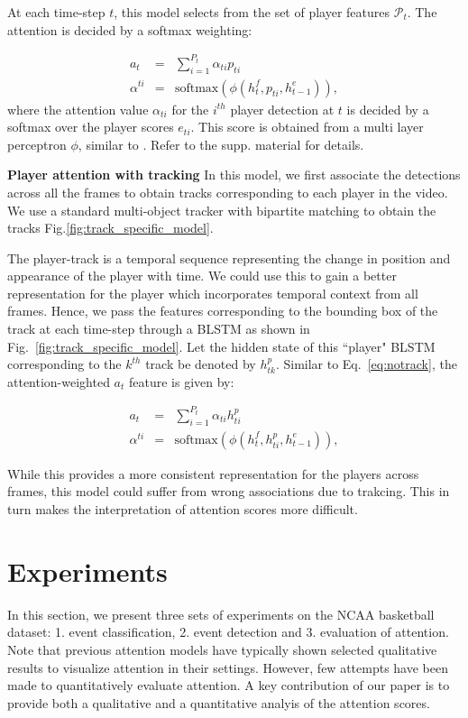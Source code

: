 \documentclass[10pt,twocolumn,letterpaper]{article}
\begin{document}
At each time-step $t$, this model selects from the set of player features
$\mathcal{P}_t$. The attention is decided by a softmax weighting:

\begin{eqnarray} \label{eq:notrack}
  a_t & = & \sum_{i=1}^{P_t} \alpha_{ti} p_{ti} \\ \nonumber
  \alpha^{ti} & = & \text{softmax} \left(\phi\left(h^f_t, p_{ti}, h^e_{t-1}\right)\right),
\end{eqnarray}where the attention value $\alpha_{ti}$ for the $i^{th}$ player
detection at $t$ is decided by a softmax over the player scores $e_{ti}$. This
score is obtained from a multi layer perceptron $\phi$, similar to
\cite{Bahdnau_arxiv14}. Refer to the supp. material for details.

\noindent \textbf{Player attention with tracking}
In this model, we first associate the detections across all the frames to
obtain tracks corresponding to each player in the video.  We use a
standard multi-object tracker with bipartite matching to obtain the tracks
Fig.\ref{fig:track_specific_model}.

The player-track is a temporal sequence representing the change in position and
appearance of the player with time.  We could use this to gain a better
representation for the player which incorporates temporal context from all
frames. Hence, we pass the features corresponding to the bounding box of the
track at each time-step through a BLSTM as shown in
Fig.~\ref{fig:track_specific_model}. Let the hidden state of this ``player"
BLSTM corresponding to the $k^{th}$ track be denoted by $h^p_{tk}$. Similar to
Eq.~\ref{eq:notrack}, the attention-weighted $a_t$ feature is given by:

\begin{eqnarray}
  a_t & = & \sum_{i=1}^{P_t} \alpha_{ti} h^p_{ti} \\ \nonumber
  \alpha^{ti} & = & \text{softmax} \left(\phi\left(h^f_t, h^p_{ti}, h^e_{t-1}\right)\right),
\end{eqnarray}

While this provides a more consistent representation for the players across frames,
this model could suffer from wrong associations due to trakcing. This in turn makes
the interpretation of attention scores more difficult.

\section{Experiments}
In this section, we present three sets of experiments on the NCAA basketball
dataset: 1. event classification, 2. event detection and 3. evaluation of
attention. Note that previous attention models have typically shown selected
qualitative results to visualize attention in their settings. However, few
attempts have been made to quantitatively evaluate attention. A key
contribution of our paper is to provide both a qualitative and a quantitative
analyis of the attention scores.
\end{document}
